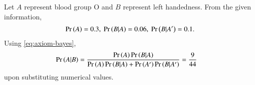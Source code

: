 Let $A$ represent blood group O and $B$ represent left handedness. 
From the given information,
\begin{align}
\Pr\left(A\right) = 0.3,\
\Pr\left(B|A\right) = 0.06,\
\Pr\left(B| A^{\prime}\right) = 0.1.
\end{align}
Using 
\eqref{eq:axiom-bayes},
\begin{align}
	\Pr\left(A|B\right) &= \frac{\Pr\left(A\right)\Pr\left(B|A\right)}{\Pr\left(A\right)\Pr\left(B|A\right)+\Pr\left(A^\prime\right)\Pr\left(B|A^\prime\right)}
	 = \frac{9}{44}
\end{align}
upon substituting numerical values.
